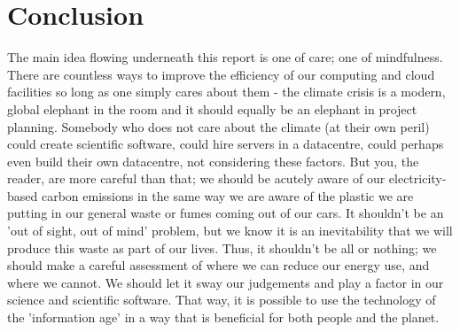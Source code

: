 \documentclass{article}
\begin{document}
\section{Conclusion}
The main idea flowing underneath this report is one of care; one of mindfulness. There are countless ways to improve the efficiency of our computing and cloud facilities so long as one simply cares about them - the climate crisis is a modern, global elephant in the room and it should equally be an elephant in project planning. Somebody who does not care about the climate (at their own peril) could create scientific software, could hire servers in a datacentre, could perhaps even build their own datacentre, not considering these factors. But you, the reader, are more careful than that; we should be acutely aware of our electricity-based carbon emissions in the same way we are aware of the plastic we are putting in our general waste or fumes coming out of our cars. It shouldn't be an 'out of sight, out of mind' problem, but we know it is an inevitability that we will produce this waste as part of our lives. Thus, it shouldn't be all or nothing; we should make a careful assessment of where we can reduce our energy use, and where we cannot. We should let it sway our judgements and play a factor in our science and scientific software. That way, it is possible to use the technology of the 'information age' in a way that is beneficial for both people and the planet.



\end{document}
